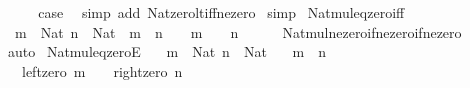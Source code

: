 \begin{isabellebody}
\ \ \isamarkupfalse%
\ \isamarkupfalse%
\ {\isacharquery}{\kern0pt}case\ \isamarkupfalse%
\ {\isacharparenleft}{\kern0pt}simp\ add{\isacharcolon}{\kern0pt}\ Nat{\isacharunderscore}{\kern0pt}zero{\isacharunderscore}{\kern0pt}lt{\isacharunderscore}{\kern0pt}iff{\isacharunderscore}{\kern0pt}ne{\isacharunderscore}{\kern0pt}zero{\isacharparenright}{\kern0pt}\isanewline
{}\isamarkupfalse%
\ simp%
\endisatagproof
{\isafoldproof}%
%
\isadelimproof
\isanewline
%
\endisadelimproof
\isanewline
{}\isamarkupfalse%
\ Nat{\isacharunderscore}{\kern0pt}mul{\isacharunderscore}{\kern0pt}eq{\isacharunderscore}{\kern0pt}zero{\isacharunderscore}{\kern0pt}iff{\isacharcolon}{\kern0pt}\isanewline
\ \ {\isachardoublequoteopen}{\isasymlbrakk}m\ {\isacharcolon}{\kern0pt}\ Nat{\isacharsemicolon}{\kern0pt}\ n\ {\isacharcolon}{\kern0pt}\ Nat{\isasymrbrakk}\ {\isasymLongrightarrow}\ m\ {\isacharasterisk}{\kern0pt}\ n\ {\isacharequal}{\kern0pt}\ {}\ {\isasymlongleftrightarrow}\ m\ {\isacharequal}{\kern0pt}\ {}\ {\isasymor}\ n\ {\isacharequal}{\kern0pt}\ {}{\isachardoublequoteclose}\isanewline
%
\isadelimproof
\ \ %
\endisadelimproof
%
\isatagproof
{}\isamarkupfalse%
\ Nat{\isacharunderscore}{\kern0pt}mul{\isacharunderscore}{\kern0pt}ne{\isacharunderscore}{\kern0pt}zero{\isacharunderscore}{\kern0pt}if{\isacharunderscore}{\kern0pt}ne{\isacharunderscore}{\kern0pt}zero{\isacharunderscore}{\kern0pt}if{\isacharunderscore}{\kern0pt}ne{\isacharunderscore}{\kern0pt}zero\ \isamarkupfalse%
\ auto%
\endisatagproof
{\isafoldproof}%
%
\isadelimproof
\isanewline
%
\endisadelimproof
\isanewline
{}\isamarkupfalse%
\ {\isachardoublequoteopen}Nat{\isacharunderscore}{\kern0pt}mul{\isacharunderscore}{\kern0pt}eq{\isacharunderscore}{\kern0pt}zeroE{\isachardoublequoteclose}{\isacharcolon}{\kern0pt}\isanewline
\ \ \ {\isachardoublequoteopen}m\ {\isacharcolon}{\kern0pt}\ Nat{\isachardoublequoteclose}\ {\isachardoublequoteopen}n\ {\isacharcolon}{\kern0pt}\ Nat{\isachardoublequoteclose}\isanewline
\ \ \ {\isachardoublequoteopen}m\ {\isacharasterisk}{\kern0pt}\ n\ {\isacharequal}{\kern0pt}\ {}{\isachardoublequoteclose}\isanewline
\ \ \ {\isacharparenleft}{\kern0pt}left{\isacharunderscore}{\kern0pt}zero{\isacharparenright}{\kern0pt}\ {\isachardoublequoteopen}m\ {\isacharequal}{\kern0pt}\ {}{\isachardoublequoteclose}\ {\isacharbar}{\kern0pt}\ {\isacharparenleft}{\kern0pt}right{\isacharunderscore}{\kern0pt}zero{\isacharparenright}{\kern0pt}\ {\isachardoublequoteopen}n\ {\isacharequal}{\kern0pt}\ {}{\isachardoublequoteclose}\isanewline

\end{isabellebody}
